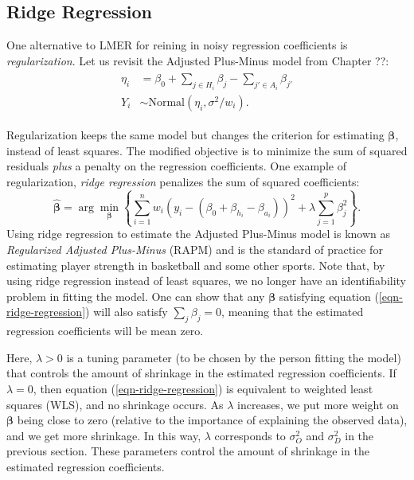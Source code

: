 \documentclass{article}
\begin{document}
  \subsection{\sc Ridge Regression}

  One alternative to LMER for reining in noisy regression coefficients is {\it regularization}. Let us revisit the Adjusted Plus-Minus model from Chapter ??:
  \begin{align*}
    \begin{split}
      \eta_i &= \beta_0 + \sum_{j \in H_i}\beta_{j} - \sum_{j' \in A_i}\beta_{j'}\\
      Y_i &\sim \mbox{Normal}(\eta_i, \sigma^2 / w_i).
    \end{split}
  \end{align*}

  Regularization keeps the same model but changes the criterion for estimating $\boldsymbol{\beta}$, instead of least squares. The modified objective is to minimize the sum of squared residuals {\it plus} a penalty on the regression coefficients. One example of regularization, {\it ridge regression} penalizes the sum of squared coefficients:
  \begin{equation}
    \label{eqn-ridge-regression}
    \boldsymbol{\hat\beta} = \arg\min_{\boldsymbol{\beta}} \left\{ \sum_{i=1}^n w_i (y_i - (\beta_0 + \beta_{h_i} - \beta_{a_i}))^2 + \lambda \sum_{j = 1}^p \beta_j^2 \right\}.
  \end{equation}
  Using ridge regression to estimate the Adjusted Plus-Minus model is known as {\it Regularized Adjusted Plus-Minus} (RAPM) and is the standard of practice for estimating player strength in basketball and some other sports. Note that, by using ridge regression instead of least squares, we no longer have an identifiability problem in fitting the model. One can show that any $\boldsymbol{\beta}$ satisfying equation (\ref{eqn-ridge-regression}) will also satisfy $\sum_j \beta_j = 0$, meaning that the estimated regression coefficients will be mean zero.


  Here, $\lambda > 0$ is a tuning parameter (to be chosen by the person fitting the model) that controls the amount of shrinkage in the estimated regression coefficients. If $\lambda = 0$, then equation (\ref{eqn-ridge-regression}) is equivalent to weighted least squares (WLS), and no shrinkage occurs. As $\lambda$ increases, we put more weight on $\boldsymbol{\beta}$ being close to zero (relative to the importance of explaining the observed data), and we get more shrinkage. In this way, $\lambda$ corresponds to $\sigma^2_O$ and $\sigma^2_D$ in the previous section. These parameters control the amount of shrinkage in the estimated regression coefficients.
\end{document}
